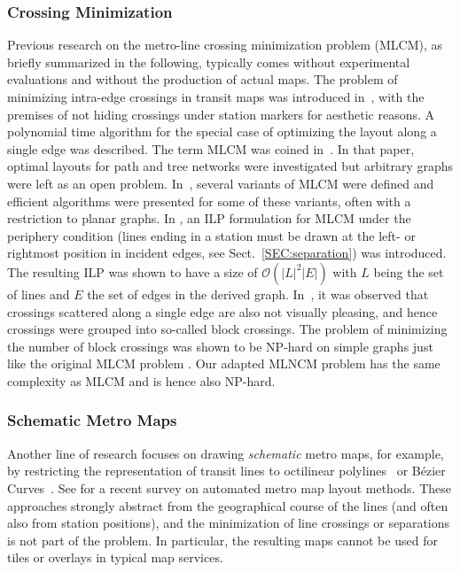 \documentclass[sigconf]{acmart}
\begin{document}
\subsubsection{Crossing Minimization}


Previous research on the metro-line crossing minimization problem (MLCM), as briefly summarized in the following, typically comes without experimental evaluations and without the production of actual maps.
The problem of minimizing intra-edge crossings in transit maps was introduced in~\cite{ben06},
with the premises of not hiding crossings under station markers for aesthetic reasons.
A polynomial time algorithm for the special case of optimizing the layout along a single edge was described.
The term MLCM was coined in~\cite{bek07}.
In that paper, optimal layouts for path and tree networks were investigated but arbitrary graphs were left as an open problem.
In~\cite{arg08, arg10, nol09}, several variants of MLCM were defined and efficient algorithms were presented for some of these variants, often with a restriction to planar graphs.
In \cite{asq08}, an ILP formulation for MLCM under the periphery condition (lines ending in a station must be drawn at the left- or rightmost position in  incident edges, see Sect.~\ref{SEC:separation}) was introduced.
The resulting ILP was shown to have a size of $\mathcal{O}(|L|^2|E|)$ with $L$ being the set of lines and $E$ the set of edges in the derived graph.
In~\cite{fin13b}, it was observed that crossings scattered along a single edge are also not visually pleasing,
and hence crossings were grouped into so-called block crossings.
The problem of minimizing the number of block crossings was shown to be NP-hard on simple graphs just like the original MLCM problem \cite{fin13a}.
Our adapted MLNCM problem has the same complexity as MLCM and is hence also NP-hard.


\subsubsection{Schematic Metro Maps}

Another line of research focuses on drawing \emph{schematic} metro maps, for example, by restricting the representation of transit lines to octilinear polylines~\cite{hon06} or B\'ezier Curves~\cite{fin12}. See \cite{nol14} for a recent survey on automated metro map layout methods. These approaches strongly abstract from the geographical course of the lines (and often also from station positions), and the minimization of line crossings or separations is not part of the problem.
In particular, the resulting maps cannot be used for tiles or overlays in typical map services.
\end{document}
